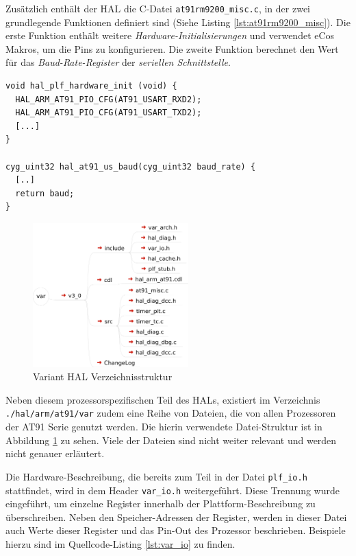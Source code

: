 \documentclass[
  a4paper,					%
  twoside,
  DIV=calc,     				%
  bibliography=totoc,
  cleardoublepage=empty,
  ngerman,     					%
  final       					%
]{scrbook}
\begin{document}
Zusätzlich enthält der HAL die C-Datei \texttt{at91rm9200\_misc.c}, in der zwei grundlegende Funktionen definiert sind (Siehe Listing \ref{lst:at91rm9200_misc}). Die erste Funktion enthält weitere \emph{Hardware-Initialisierungen} und verwendet eCos Makros, um die Pins zu konfigurieren. Die zweite Funktion berechnet den Wert für das \emph{Baud-Rate-Register} der \emph{seriellen Schnittstelle}.

\begin{lstlisting}[frame=single, float, caption={at91rm9200\_misc.c}, label={lst:at91rm9200_misc}]
void hal_plf_hardware_init (void) {
  HAL_ARM_AT91_PIO_CFG(AT91_USART_RXD2);
  HAL_ARM_AT91_PIO_CFG(AT91_USART_TXD2);
  [...]
}

cyg_uint32 hal_at91_us_baud(cyg_uint32 baud_rate) {
  [..]
  return baud;
}
\end{lstlisting}

\begin{figure}
\includegraphics[width=6cm]{HAL_Var_Dir_Map}
\caption{Variant HAL Verzeichnisstruktur}
\label{fig:HAL_Var_Dir_Map}
\end{figure}

Neben diesem prozessorspezifischen Teil des HALs, existiert im Verzeichnis \texttt{./hal/arm/at91/var} zudem eine Reihe von Dateien, die von allen Prozessoren der AT91 Serie genutzt werden. Die hierin verwendete Datei-Struktur ist in Abbildung \ref{fig:HAL_Var_Dir_Map} zu sehen. Viele der Dateien sind nicht weiter relevant und werden nicht genauer erläutert.

Die Hardware-Beschreibung, die bereits zum Teil in der Datei \texttt{plf\_io.h} stattfindet, wird in dem Header \texttt{var\_io.h} weitergeführt. Diese Trennung wurde eingeführt, um einzelne Register innerhalb der Plattform-Beschreibung zu überschreiben. Neben den Speicher-Adressen der Register, werden in dieser Datei auch Werte dieser Register und das Pin-Out des Prozessor beschrieben. Beispiele hierzu sind im Quellcode-Listing \ref{lst:var_io} zu finden.
\end{document}

